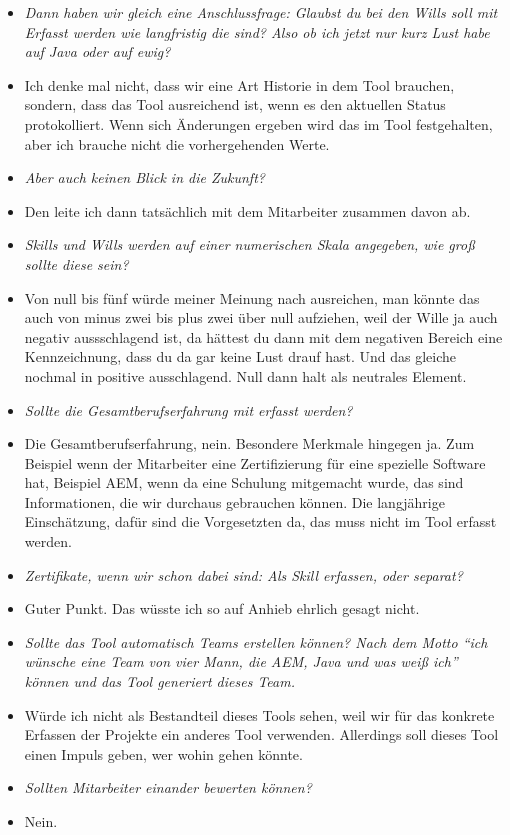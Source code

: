 \begin{appendices}
\begin{itemize}
\item[] \textit{Dann haben wir gleich eine Anschlussfrage: Glaubst du bei den Wills soll mit Erfasst werden wie langfristig die sind? Also ob ich jetzt nur kurz Lust habe auf Java oder auf ewig?}
\item[] Ich denke mal nicht, dass wir eine Art Historie in dem Tool brauchen, sondern, dass das Tool ausreichend ist, wenn es den aktuellen Status protokolliert. Wenn sich Änderungen ergeben wird das im Tool festgehalten, aber ich brauche nicht die vorhergehenden Werte.

\item[] \textit{Aber auch keinen Blick in die Zukunft?}
\item[] Den leite ich dann tatsächlich mit dem Mitarbeiter zusammen davon ab.

\item[] \textit{Skills und Wills werden auf einer numerischen Skala angegeben, wie groß sollte diese sein?}
\item[] Von null bis fünf würde meiner Meinung nach ausreichen, man könnte das auch von minus zwei bis plus zwei über null aufziehen, weil der Wille ja auch negativ aussschlagend ist, da hättest du dann mit dem negativen Bereich eine Kennzeichnung, dass du da gar keine Lust drauf hast. Und das gleiche nochmal in positive ausschlagend. Null dann halt als neutrales Element.

\item[] \textit{Sollte die Gesamtberufserfahrung mit erfasst werden?}
\item[] Die Gesamtberufserfahrung, nein. Besondere Merkmale hingegen ja. Zum Beispiel wenn der Mitarbeiter eine Zertifizierung für eine spezielle Software hat, Beispiel AEM, wenn da eine Schulung mitgemacht wurde, das sind Informationen, die wir durchaus gebrauchen können.  Die langjährige Einschätzung, dafür sind die Vorgesetzten da, das muss nicht im Tool erfasst werden.

\item[] \textit{Zertifikate, wenn wir schon dabei sind: Als Skill erfassen, oder separat?}
\item[] Guter Punkt. Das wüsste ich so auf Anhieb ehrlich gesagt nicht.

\item[] \textit{Sollte das Tool automatisch Teams erstellen können? Nach dem Motto “ich wünsche eine Team von vier Mann, die AEM, Java und was weiß ich” können und das Tool generiert dieses Team.}
\item[] Würde ich nicht als Bestandteil dieses Tools sehen, weil wir für das konkrete Erfassen der Projekte ein anderes Tool verwenden. Allerdings soll dieses Tool einen Impuls geben, wer wohin gehen könnte.
\item[] \textit{Sollten Mitarbeiter einander bewerten können?}
\item[] Nein.
\end{itemize}


\end{appendices}
